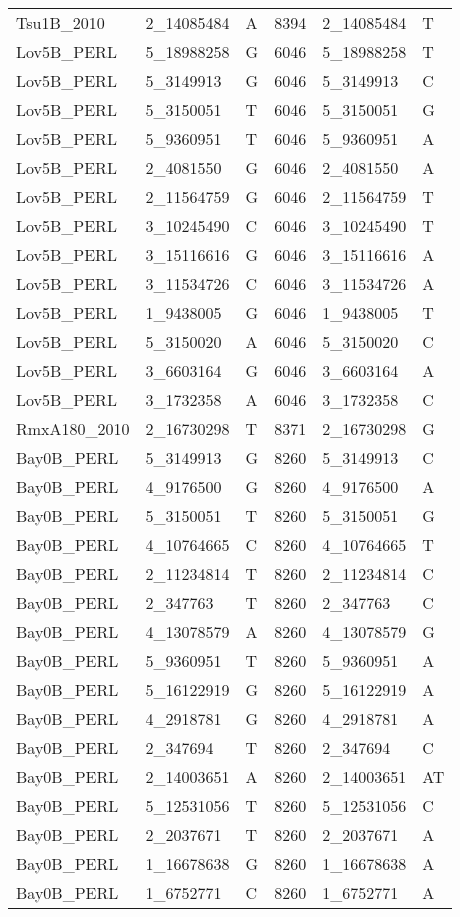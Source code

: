 \begin{center}
\begin{longtable}{|l|l|l|l|l|l|}
Tsu1B\_2010&2\_14085484&A&8394&2\_14085484&T\\
Lov5B\_PERL&5\_18988258&G&6046&5\_18988258&T\\
Lov5B\_PERL&5\_3149913&G&6046&5\_3149913&C\\
Lov5B\_PERL&5\_3150051&T&6046&5\_3150051&G\\
Lov5B\_PERL&5\_9360951&T&6046&5\_9360951&A\\
Lov5B\_PERL&2\_4081550&G&6046&2\_4081550&A\\
Lov5B\_PERL&2\_11564759&G&6046&2\_11564759&T\\
Lov5B\_PERL&3\_10245490&C&6046&3\_10245490&T\\
Lov5B\_PERL&3\_15116616&G&6046&3\_15116616&A\\
Lov5B\_PERL&3\_11534726&C&6046&3\_11534726&A\\
Lov5B\_PERL&1\_9438005&G&6046&1\_9438005&T\\
Lov5B\_PERL&5\_3150020&A&6046&5\_3150020&C\\
Lov5B\_PERL&3\_6603164&G&6046&3\_6603164&A\\
Lov5B\_PERL&3\_1732358&A&6046&3\_1732358&C\\
RmxA180\_2010&2\_16730298&T&8371&2\_16730298&G\\
Bay0B\_PERL&5\_3149913&G&8260&5\_3149913&C\\
Bay0B\_PERL&4\_9176500&G&8260&4\_9176500&A\\
Bay0B\_PERL&5\_3150051&T&8260&5\_3150051&G\\
Bay0B\_PERL&4\_10764665&C&8260&4\_10764665&T\\
Bay0B\_PERL&2\_11234814&T&8260&2\_11234814&C\\
Bay0B\_PERL&2\_347763&T&8260&2\_347763&C\\
Bay0B\_PERL&4\_13078579&A&8260&4\_13078579&G\\
Bay0B\_PERL&5\_9360951&T&8260&5\_9360951&A\\
Bay0B\_PERL&5\_16122919&G&8260&5\_16122919&A\\
Bay0B\_PERL&4\_2918781&G&8260&4\_2918781&A\\
Bay0B\_PERL&2\_347694&T&8260&2\_347694&C\\
Bay0B\_PERL&2\_14003651&A&8260&2\_14003651&AT\\
Bay0B\_PERL&5\_12531056&T&8260&5\_12531056&C\\
Bay0B\_PERL&2\_2037671&T&8260&2\_2037671&A\\
Bay0B\_PERL&1\_16678638&G&8260&1\_16678638&A\\
Bay0B\_PERL&1\_6752771&C&8260&1\_6752771&A\\

\end{longtable}
\end{center}
